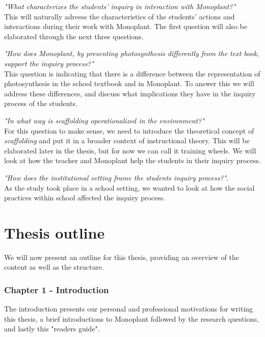 \begin{noindlist}
\item \emph{"What characterizes the students’ inquiry in interaction with Monoplant?"}\\
This will naturally adreess the characteristics of the students' actions and interactions during their work with Monoplant. The first question will also be elaborated through the next three questions.
\item \emph{"How does Monoplant, by presenting photosynthesis differently from the text book, support the inquiry process?"}\\
This question is indicating that there is a difference between the representation of photosynthesis in the school textbook and in Monoplant. To answer this we will address these differences, and discuss what implications they have in the inquiry process of the students.
\item \emph{"In what way is scaffolding operationalized in the environment?"}\\
For this question to make sense, we need to introduce the theoretical concept of \emph{scaffolding} and put it in a broader context of instructional theory. This will be elaborated later in the thesis, but for now we can call it training wheels. We will look at how the teacher and Monoplant help the students in their inquiry process.
\item \emph{"How does the institutional setting frame the students inquiry process?"}.\\
As the study took place in a school setting, we wanted to look at how the social practices within school affected the inquiry process.
\end{noindlist}


\section{Thesis outline}
We will now present an outline for this thesis, providing an overview of the content as well as the structure. 

\subsubsection*{Chapter 1 - Introduction}
The introduction presents our personal and professional motivations for writing this thesis, a brief introductions to Monoplant followed by the research questions, and lastly this "readers guide".

